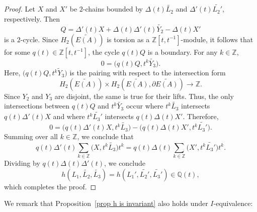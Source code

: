 \documentclass[a4paper, 11pt]{amsart}
\theoremstyle{definition}
\newcommand{\bdry}{\partial}
\newcommand{\Q}{\mathbb{Q}}
\newcommand{\Z}{\mathbb{Z}}
\newcommand{\noteta}{h}
\begin{document}
\begin{proof}
Let $X$ and $X'$ be $2$-chains bounded by $\Delta(t) \widetilde{L_2}$ and $\Delta'(t) \widetilde{L_2'}$, respectively. Then
\[
Q=\Delta'(t)X+\Delta(t)\Delta'(t)\widetilde{Y_2}-\Delta(t)X'
\]
is a $2$-cycle. Since $H_2(\widetilde{E(A)})$ is torsion as a $\Z[t,t^{-1}]$-module, it follows that for some $q(t)\in \Z[t,t^{-1}]$, the cycle $q(t) Q$ is a boundary. For any $k\in\Z$,
\[
0=\bigl(q(t) Q, t^k\widetilde{Y_3}\bigr).
\]
Here, $\bigl(q(t) Q, t^k\widetilde{Y}_3\bigr)$ is the pairing with respect to the intersection form $$H_2(\widetilde{E(A)}) \times H_2(\widetilde{E(A)}, \bdry\widetilde{E(A)}) \to \Z.$$
Since $Y_2$ and $Y_3$ are disjoint, the same is true for their lifts. Thus, the only intersections between $q(t) Q$ and $t^k\widetilde{Y_3}$ occur where $t^k\widetilde{L_3}$ intersects $q(t)\Delta'(t)X$ and where $t^k\widetilde{L_3'}$ intersects $q(t)\Delta(t)X'$. Therefore,
\[
0=\bigl(q(t)\Delta'(t)X, t^k\widetilde{L_3}\bigr)-\bigl(q(t)\Delta(t)X', t^k\widetilde{L_3'}\bigr).
\]
Summing over all $k\in \mathbb{Z}$, we conclude that
\[
q(t)\Delta'(t)\sum_{k\in \mathbb{Z}} \bigl(X, t^k\widetilde{L_3}\bigr)t^k
=
q(t)\Delta(t)\sum_{k\in \mathbb{Z}} \bigl(X', t^k\widetilde{L_3'}\bigr)t^k.
\]  Dividing by $q(t)\Delta(t)\Delta'(t)$, we conclude
\[
\noteta(L_1,\widetilde{L_2},\widetilde{L_3})
=
\noteta(L_1',\widetilde{L_2'},\widetilde{L_3'})\in \Q(t),
\]
which completes the proof.
\end{proof}




We remark that Proposition~\ref{prop h is invariant} also holds under $I$-equivalence:
\end{document}
